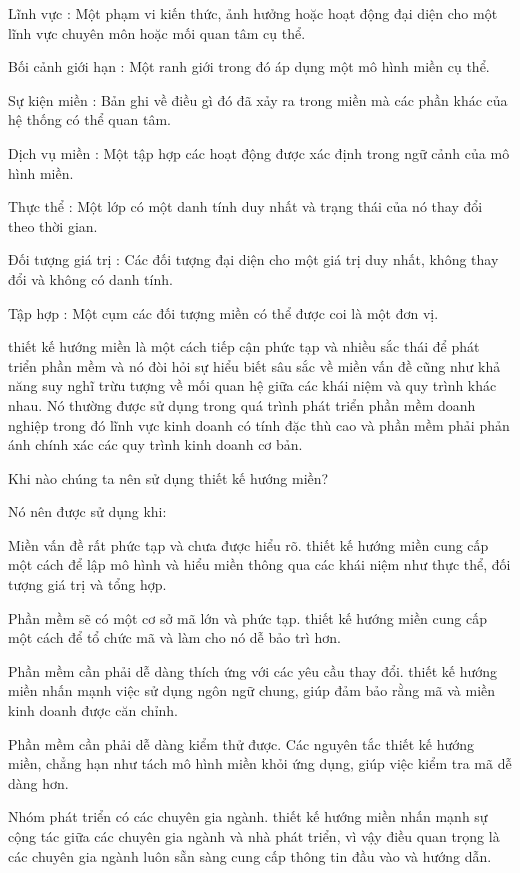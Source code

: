 Lĩnh vực : Một phạm vi kiến thức, ảnh hưởng hoặc hoạt động đại diện cho một lĩnh vực chuyên môn hoặc mối quan tâm cụ thể.

Bối cảnh giới hạn : Một ranh giới trong đó áp dụng một mô hình miền cụ thể.

Sự kiện miền : Bản ghi về điều gì đó đã xảy ra trong miền mà các phần khác của hệ thống có thể quan tâm.

Dịch vụ miền : Một tập hợp các hoạt động được xác định trong ngữ cảnh của mô hình miền.

Thực thể : Một lớp có một danh tính duy nhất và trạng thái của nó thay đổi theo thời gian.

Đối tượng giá trị : Các đối tượng đại diện cho một giá trị duy nhất, không thay đổi và không có danh tính.

Tập hợp : Một cụm các đối tượng miền có thể được coi là một đơn vị.

thiết kế hướng miền là một cách tiếp cận phức tạp và nhiều sắc thái để phát triển phần mềm và nó đòi hỏi sự hiểu biết sâu sắc về miền vấn đề cũng như khả năng suy nghĩ trừu tượng về mối quan hệ giữa các khái niệm và quy trình khác nhau. Nó thường được sử dụng trong quá trình phát triển phần mềm doanh nghiệp trong đó lĩnh vực kinh doanh có tính đặc thù cao và phần mềm phải phản ánh chính xác các quy trình kinh doanh cơ bản.

Khi nào chúng ta nên sử dụng thiết kế hướng miền?

Nó nên được sử dụng khi:

Miền vấn đề rất phức tạp và chưa được hiểu rõ. thiết kế hướng miền cung cấp một cách để lập mô hình và hiểu miền thông qua các khái niệm như thực thể, đối tượng giá trị và tổng hợp.

Phần mềm sẽ có một cơ sở mã lớn và phức tạp. thiết kế hướng miền cung cấp một cách để tổ chức mã và làm cho nó dễ bảo trì hơn.

Phần mềm cần phải dễ dàng thích ứng với các yêu cầu thay đổi. thiết kế hướng miền nhấn mạnh việc sử dụng ngôn ngữ chung, giúp đảm bảo rằng mã và miền kinh doanh được căn chỉnh.

Phần mềm cần phải dễ dàng kiểm thử được. Các nguyên tắc thiết kế hướng miền, chẳng hạn như tách mô hình miền khỏi ứng dụng, giúp việc kiểm tra mã dễ dàng hơn.

Nhóm phát triển có các chuyên gia ngành. thiết kế hướng miền nhấn mạnh sự cộng tác giữa các chuyên gia ngành và nhà phát triển, vì vậy điều quan trọng là các chuyên gia ngành luôn sẵn sàng cung cấp thông tin đầu vào và hướng dẫn.

